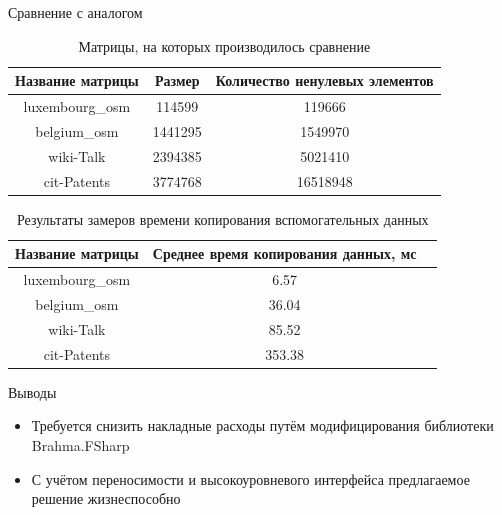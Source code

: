 \documentclass{beamer}
\begin{document}
\begin{frame}{Сравнение с аналогом}
    
    \begin{table}[h]
    \center{}
    
    \begin{tabular}{ | c | c | c | }
    \hline
    Название матрицы & Размер & Количество ненулевых элементов \\ \hline
    luxembourg\_osm & 114599 & 119666 \\ \hline
    belgium\_osm & 1441295 & 1549970 \\ \hline
    wiki-Talk & 2394385 & 5021410 \\ \hline
    cit-Patents & 3774768 & 16518948 \\ \hline
    \end{tabular}
    
    \caption{Матрицы, на которых производилось сравнение}
    \label{matrices}
    \end{table}
    
    \begin{table}[h]
    \center{}
    
    \begin{tabular}{ | c | c | c | }
    \hline
    Название матрицы & Среднее время копирования данных, мс \\ \hline
    luxembourg\_osm & 6.57 \\ \hline
    belgium\_osm & 36.04 \\ \hline
    wiki-Talk & 85.52 \\ \hline
    cit-Patents & 353.38 \\ \hline
    \end{tabular}
    
    \caption{Результаты замеров времени копирования вспомогательных данных}
    \end{table}
    
\end{frame}

\begin{frame}{Выводы}
    
    \begin{itemize}
        \item Требуется снизить накладные расходы путём модифицирования библиотеки Brahma.FSharp
        \item С учётом переносимости и высокоуровневого интерфейса предлагаемое решение жизнеспособно
    \end{itemize}
    
\end{frame}
\end{document}
